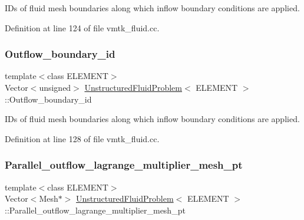 I\+Ds of fluid mesh boundaries along which inflow boundary conditions are applied. 



Definition at line 124 of file vmtk\+\_\+fluid.\+cc.

\mbox{\label{classUnstructuredFluidProblem_a9bace139103152045dfe88e3d0163811}} 
\subsubsection{\texorpdfstring{Outflow\+\_\+boundary\+\_\+id}{Outflow\_boundary\_id}}
{\footnotesize\ttfamily template$<$class E\+L\+E\+M\+E\+NT$>$ \\
Vector$<$unsigned$>$ \hyperlink{classUnstructuredFluidProblem}{Unstructured\+Fluid\+Problem}$<$ E\+L\+E\+M\+E\+NT $>$\+::Outflow\+\_\+boundary\+\_\+id\hspace{0.3cm}{\ttfamily [private]}}



I\+Ds of fluid mesh boundaries along which inflow boundary conditions are applied. 



Definition at line 128 of file vmtk\+\_\+fluid.\+cc.

\mbox{\label{classUnstructuredFluidProblem_a537c5d8a474eccb58f4de75cbdab4e9d}} 
\subsubsection{\texorpdfstring{Parallel\+\_\+outflow\+\_\+lagrange\+\_\+multiplier\+\_\+mesh\+\_\+pt}{Parallel\_outflow\_lagrange\_multiplier\_mesh\_pt}}
{\footnotesize\ttfamily template$<$class E\+L\+E\+M\+E\+NT$>$ \\
Vector$<$Mesh$\ast$$>$ \hyperlink{classUnstructuredFluidProblem}{Unstructured\+Fluid\+Problem}$<$ E\+L\+E\+M\+E\+NT $>$\+::Parallel\+\_\+outflow\+\_\+lagrange\+\_\+multiplier\+\_\+mesh\+\_\+pt\hspace{0.3cm}{\ttfamily [private]}}



